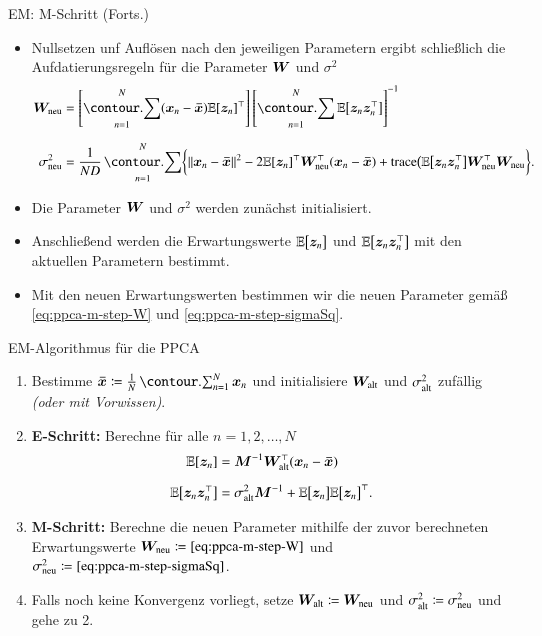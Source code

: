 \begin{frame}{EM: M-Schritt (Forts.)}{}
	\begin{itemize}
		\item Nullsetzen unf Auflösen nach den jeweiligen Parametern ergibt schließlich die Aufdatierungsregeln
			für die Parameter $\bm{W}$ und $\sigma^2$
		\begin{align}
		\label{eq:ppca-m-step-W}
			\bWNew
				&= \left[ \sum_{n=1}^N (\bx_n - \bxmean) \E[\bz_n]^\top \right] \left[ \sum_{n=1}^N \E\bigl[ \bz_n \bz_n^\top \bigr] \right]^{-1}
		\\[2mm]
		\label{eq:ppca-m-step-sigmaSq}
			\sigmaSqNew
				&= \frac{1}{N D} \sum_{n=1}^N \biggl\{
					\Vert \bx_n - \bxmean \Vert^2 - 2 \E[\bz_n]^\top \bWNew^\top (\bx_n - \bxmean) +
					\trace\bigl( \E\bigl[ \bz_n \bz_n^\top \bigr] \bWNew^\top \bWNew
				\biggr\}.
		\end{align}
		\item Die Parameter $\bm{W}$ und $\sigma^2$ werden zunächst initialisiert.
		\item Anschließend werden die Erwartungswerte $\mathbb{E}\bigl[ \bm{z}_n \bigr]$ und $\mathbb{E}\bigl[ \bm{z}_n \bm{z}_n^\top \bigr]$ mit den aktuellen
			Parametern bestimmt.
		\item Mit den neuen Erwartungswerten bestimmen wir die neuen Parameter gemäß \eqref{eq:ppca-m-step-W}
			und \eqref{eq:ppca-m-step-sigmaSq}.
	\end{itemize}
\end{frame}


\begin{frame}{EM-Algorithmus für die PPCA}{}
	\begin{myalg}
		\begin{enumerate}
			\item Bestimme $\bxmean \coloneqq \frac{1}{N} \sum_{n=1}^N \bx_n$ und initialisiere $\bm{W}_{\text{alt}}$ und $\sigma^2_{\text{alt}}$ zufällig
				\textit{(oder mit Vorwissen)}.
			\item \textbf{E-Schritt:} Berechne für alle $n = 1, 2, \ldots, N$
			\begin{align*}
				\mathbb{E}[\bm{z}_n]
					&= \bm{M}^{-1} \bm{W}_{\text{alt}}^\top (\bm{x}_n - \bm{\bar{x}})
			\\[2mm]
				\mathbb{E}\bigl[ \bm{z}_n \bm{z}_n^\top \bigr]
					&= \sigma^2_{\text{alt}} \bm{M}^{-1} + \mathbb{E}\bigl[ \bm{z}_n \bigr] \mathbb{E}\bigl[ \bm{z}_n \bigr]^\top.
			\end{align*}
			\item \textbf{M-Schritt:} Berechne die neuen Parameter mithilfe der zuvor berechneten Erwartungswerte
				$\bWNew \coloneqq \eqref{eq:ppca-m-step-W}$ und $\sigmaSqNew \coloneqq \eqref{eq:ppca-m-step-sigmaSq}$.
			\item Falls noch keine Konvergenz vorliegt, setze $\bm{W}_{\text{alt}} \coloneqq \bm{W}_{\text{neu}}$ und $\sigma^2_{\text{alt}} \coloneqq \sigma^2_{\text{neu}}$
				und gehe zu 2.
		\end{enumerate}
	\end{myalg}
\end{frame}


